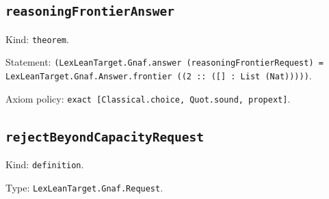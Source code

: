 \documentclass[11pt]{article}
\begin{document}
\subsection*{\texttt{reasoningFrontierAnswer}}
\noindent Kind: \texttt{theorem}.\par
\noindent Statement: \texttt{(LexLeanTarget.Gnaf.answer (reasoningFrontierRequest) = LexLeanTarget.Gnaf.Answer.frontier ((2 :: ([] : List (Nat)))))}.\par
\noindent Axiom policy: \texttt{exact [Classical.choice, Quot.sound, propext]}.\par
\subsection*{\texttt{rejectBeyondCapacityRequest}}
\noindent Kind: \texttt{definition}.\par
\noindent Type: \texttt{LexLeanTarget.Gnaf.Request}.\par
\end{document}
